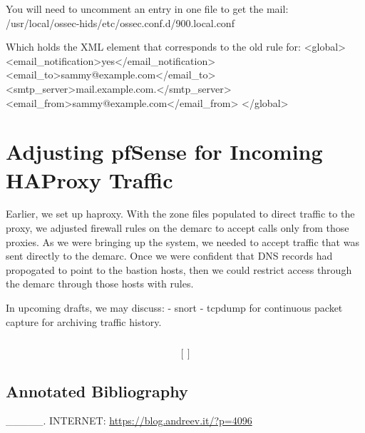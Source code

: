 You will need to uncomment an entry in one file to get the mail:
/usr/local/ossec-hids/etc/ossec.conf.d/900.local.conf

Which holds the XML element that corresponds to the old rule for:
<global>
    <email\_notification>yes</email\_notification>
    <email\_to>sammy@example.com</email\_to>
    <smtp\_server>mail.example.com.</smtp\_server>
    <email\_from>sammy@example.com</email\_from>
</global>

\section{Adjusting pfSense for Incoming HAProxy Traffic}
Earlier, we set up haproxy.  With the zone files populated to direct traffic to the proxy, we adjusted firewall rules on the demarc to accept calls only from those proxies.  As we were bringing up the system, we needed to accept traffic that was sent directly to the demarc.  Once we were confident that DNS records had propogated to point to the bastion hosts, then we could restrict access through the demarc through those hosts with rules.  

In upcoming drafts, we may discuss:
- snort
- tcpdump for continuous packet capture for archiving traffic history.






\begin{lstlisting}
\end{lstlisting}
 \[[]\]
\subsection{Annotated Bibliography}


\endnote{[1]} \_\_\_\_\_.  INTERNET:   \url{https://blog.andreev.it/?p=4096}

\markchapterendnotes
